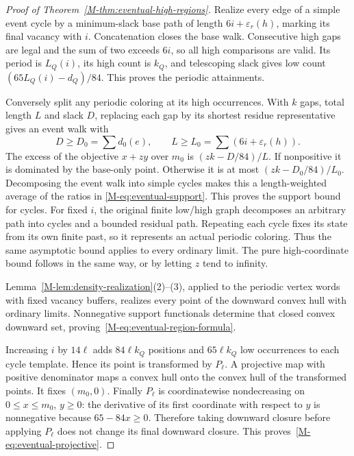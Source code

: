 \documentclass[11pt,reqno]{amsart}
\theoremstyle{plain}
\theoremstyle{plain}
\theoremstyle{plain}
\begin{document}
\begin{proof}[Proof of Theorem~\ref{M-thm:eventual-high-regions}]
Realize every edge of a simple event cycle by a minimum-slack base path
of length $6i+\varepsilon_r(h)$, marking its final vacancy with $i$.
Concatenation closes the base walk. Consecutive high gaps are legal and
the sum of two exceeds $6i$, so all high comparisons are valid. Its
period is $L_Q(i)$, its high count is $k_Q$, and telescoping slack gives
low count $(65L_Q(i)-d_Q)/84$. This proves the periodic attainments.

Conversely split any periodic coloring at its high occurrences. With
$k$ gaps, total length $L$ and slack $D$, replacing each gap by its
shortest residue representative gives an event walk with
\[
D\ge D_0=\sum d_0(e),\qquad
L\ge L_0=\sum(6i+\varepsilon_r(h)).
\]
The excess of the objective $x+zy$ over $m_0$ is $(zk-D/84)/L$.
If nonpositive it is dominated by the base-only point. Otherwise it is
at most $(zk-D_0/84)/L_0$. Decomposing the event walk into simple cycles
makes this a length-weighted average of the ratios in
\eqref{M-eq:eventual-support}. This proves the support bound for cycles.
For fixed $i$, the original finite low/high graph decomposes an arbitrary
path into cycles and a bounded residual path. Repeating each cycle fixes
its state from its own finite past, so it represents an actual periodic
coloring. Thus the same asymptotic
bound applies to every ordinary limit. The pure high-coordinate bound
follows in the same way, or by letting $z$ tend to infinity.

Lemma~\ref{M-lem:density-realization}(2)--(3), applied to the periodic
vertex words with fixed vacancy buffers, realizes every point of the
downward convex hull with ordinary limits.
Nonnegative support functionals determine that closed convex downward
set, proving~\eqref{M-eq:eventual-region-formula}.

Increasing $i$ by $14\ell$ adds $84\ell k_Q$ positions and $65\ell k_Q$
low occurrences to each cycle template. Hence its point is transformed
by $P_\ell$. A projective map with positive denominator maps a convex
hull onto the convex hull of the transformed points. It fixes $(m_0,0)$.
Finally $P_\ell$ is coordinatewise nondecreasing on
$0\le x\le m_0$, $y\ge0$: the derivative of its first coordinate with
respect to $y$ is nonnegative because $65-84x\ge0$. Therefore taking downward
closure before applying $P_\ell$ does not change its final downward
closure. This proves~\eqref{M-eq:eventual-projective}.
\end{proof}
\end{document}
